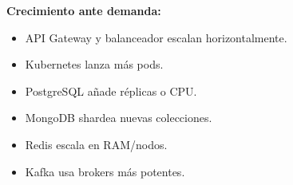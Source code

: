 	\textbf{Crecimiento ante demanda:}
	\begin{itemize}
		\item API Gateway y balanceador escalan horizontalmente.
		\item Kubernetes lanza más pods.
		\item PostgreSQL añade réplicas o CPU.
		\item MongoDB shardea nuevas colecciones.
		\item Redis escala en RAM/nodos.
		\item Kafka usa brokers más potentes.
	\end{itemize}
